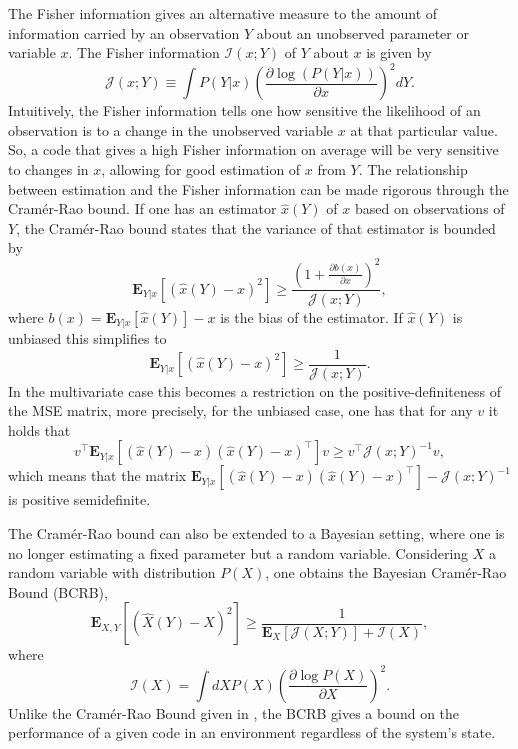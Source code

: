 The Fisher information gives an alternative measure to the amount of information carried by an observation $Y$ about an unobserved parameter or variable $x$.
The Fisher information $\mathcal{I}(x;Y)$ of $Y$ about $x$ is given by
\begin{equation}
\mathcal{J}(x;Y) \equiv \int P(Y|x) \left(\frac{\partial \log\left(P(Y|x)\right)}{\partial x}\right)^2 dY.
\end{equation}
Intuitively, the Fisher information tells one how sensitive the likelihood of an observation is to a change in the unobserved variable $x$ at that particular value. So,
a code that gives a high Fisher information on average will be very sensitive to changes in $x$, allowing for good estimation of $x$ from $Y$.
The relationship between estimation and the Fisher information can be made rigorous through the Cram\'{e}r-Rao bound. If one has an estimator
$\hat{x}(Y)$ of $x$ based on observations of $Y$, the Cram\'{e}r-Rao bound states that the variance of that estimator is bounded by
\begin{equation}
\label{eq:crb}
\boldsymbol{E}_{Y|x} \left[\left(\hat{x}(Y) - x\right)^2\right]  \ge \frac{\left(1+\frac{\partial b(x)}{\partial x}\right)^2}{\mathcal{J}(x;Y)},
\end{equation}
where $b(x) = \boldsymbol{E}_{Y|x}[\hat{x}(Y)] - x$ is the bias of the estimator. If $\hat{x}(Y)$ is unbiased this simplifies to
\[
\boldsymbol{E}_{Y|x} \left[(\hat{x}(Y) -x)^2\right]  \ge \frac{1}{\mathcal{J}(x;Y)}.
\]
In the multivariate case this becomes a restriction on the positive-definiteness of the MSE matrix, more precisely, for the unbiased case, one has that for any
$v$ it holds that 
\[
v^\top \boldsymbol{E}_{Y|x} \left[(\hat{x}(Y) -x)(\hat{x}(Y) -x)^\top\right] v \ge v^\top \mathcal{J}(x;Y)^{-1} v,
\]
which means that the matrix $\boldsymbol{E}_{Y|x} \left[(\hat{x}(Y) -x)(\hat{x}(Y) -x)^\top\right]-\mathcal{J}(x;Y)^{-1}$ is positive semidefinite.\par

The Cram\'{e}r-Rao bound can also be extended to a Bayesian setting, where one is no longer estimating a fixed parameter but a random variable. Considering $X$
a random variable with distribution $P(X)$, one obtains the Bayesian Cram\'{e}r-Rao Bound (BCRB),
\[
\boldsymbol{E}_{X,Y} \left[\left(\hat{X}(Y) - X\right)^2\right]  \ge \frac{1}{\boldsymbol{E}_X\left[\mathcal{J}(X;Y)\right] + \mathcal{I}(X)},
\]
where
\[
\mathcal{I}(X) = \int dX P(X) \left(\frac{\partial \log P(X)}{\partial X}\right)^2.
\]
Unlike the Cram\'{e}r-Rao Bound given in , the BCRB gives a bound on the performance of a given code in an environment regardless of the 
system's state.\par

